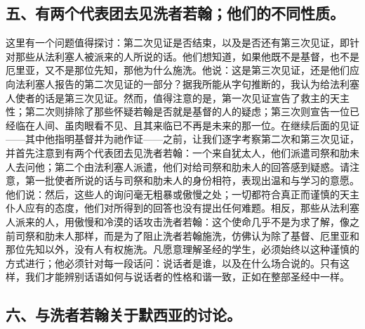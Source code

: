 
\subsection{五、有两个代表团去见洗者若翰；他们的不同性质。}

这里有一个问题值得探讨：第二次见证是否结束，以及是否还有第三次见证，即针对那些从法利塞人被派来的人所说的话。他们想知道，如果他既不是基督，也不是厄里亚，又不是那位先知，那他为什么施洗。他说：这是第三次见证，还是他们应向法利塞人报告的第二次见证的一部分？据我所能从字句推断的，我认为给法利塞人使者的话是第三次见证。然而，值得注意的是，第一次见证宣告了救主的天主性；第二次则排除了那些怀疑若翰是否就是基督的人的疑虑；第三次则宣告一位已经临在人间、虽肉眼看不见、且其来临已不再是未来的那一位。在继续后面的见证——其中他指明基督并为祂作证——之前，让我们逐字考察第二次和第三次见证，并首先注意到有两个代表团去见洗者若翰：一个来自犹太人，他们派遣司祭和肋未人去问他；第二个由法利塞人派遣，他们对给司祭和肋未人的回答感到疑惑。请注意，第一批使者所说的话与司祭和肋未人的身份相符，表现出温和与学习的意愿。他们说：然后，这些人的询问毫无粗暴或傲慢之处；一切都符合真正而谨慎的天主仆人应有的态度，他们对所得到的回答也没有提出任何难题。相反，那些从法利塞人派来的人，用傲慢和冷漠的话攻击洗者若翰：这个使命几乎不是为求了解，像之前司祭和肋未人那样，而是为了阻止洗者若翰施洗，仿佛认为除了基督、厄里亚和那位先知以外，没有人有权施洗。凡愿意理解圣经的学生，必须始终以这种谨慎的方式进行；他必须针对每一段话问：说话者是谁，以及在什么场合说的。只有这样，我们才能辨别话语如何与说话者的性格和谐一致，正如在整部圣经中一样。\par


\subsection{六、与洗者若翰关于默西亚的讨论。}

